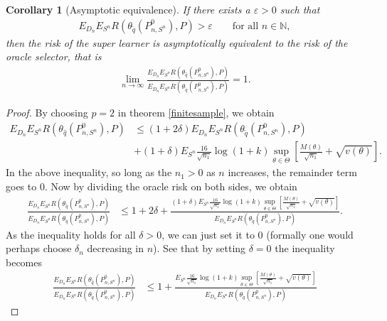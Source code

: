 \documentclass[11pt, a4paper]{article}
\newtheorem{corollary}[theorem]{Corollary}
\theoremstyle{definition}
\theoremstyle{remark}
\newcommand{\q}{q}
\newcommand{\btheta}{\theta}
\newcommand{\Sn}{S^n}
\begin{document}
\begin{corollary}[Asymptotic equivalence] 
    If there exists a $ \varepsilon > 0 $ such that 
   \begin{align*}
       E_{D_n} E_{\Sn} R(\btheta_{ \tilde{\q} }(P_{n, \Sn}^{0}), P) > \varepsilon \qquad \text{for all } n \in \mathbb{N},
   \end{align*}
    then the risk of the super learner is asymptotically equivalent to the risk of the oracle selector, that is
   \begin{align*}
       \lim_{n \to \infty} \frac{E_{D_n} E_{\Sn} R(\btheta_{ \hat{\q} }(P_{n, \Sn}^{0}), P)}{E_{D_n} E_{\Sn} R(\btheta_{ \tilde{\q} }(P_{n, \Sn}^{0}), P)} = 1.
   \end{align*}
\end{corollary}
\begin{proof}
    By choosing $ p = 2 $ in theorem \ref{finitesample}, we obtain
    \begin{align*}
        E_{D_n} E_{\Sn} R(\btheta_{\hat{\q}}(P_{n, \Sn}^{0}), P) &\leq(1 + 2 \delta) E_{D_n} E_{\Sn} R(\btheta_{ \tilde{\q}}(P_{n,\Sn}^{0}), P)\\
                                                                 &+(1 + \delta) E_{\Sn} \frac{16}{\sqrt{n_1}} \log (1 +k) \sup_{\btheta \in \Theta} \left[ \frac{M(\theta)}{\sqrt{n_1}} + \sqrt{v(\theta)} \right].
    \end{align*}
    In the above inequality, so long as the $ n_1 > 0 $ as $ n $ increases, the remainder term goes to $ 0 $. Now by dividing the oracle risk on both sides, we obtain
    \begin{align*}
        \frac{E_{D_n} E_{\Sn} R(\btheta_{\hat{\q}}(P_{n, \Sn}^{0}), P)}{E_{D_n} E_{\Sn} R(\btheta_{ \tilde{\q}}(P_{n,\Sn}^{0}), P)} &\leq 1 + 2 \delta + \frac{(1 + \delta)E_{\Sn} \frac{16}{\sqrt{n_1}} \log (1 +k) \sup_{\btheta \in \Theta} \left[ \frac{M(\theta)}{\sqrt{n_1}} + \sqrt{v(\theta)} \right]}{E_{D_n} E_{\Sn} R(\btheta_{ \tilde{\q}}(P_{n,\Sn}^{0}), P)} .
    \end{align*}
    As the inequality holds for all $ \delta > 0 $, we can just set it to 0 (formally one would perhaps choose $ \delta_n $ decreasing in $ n $). See that by setting $ \delta = 0 $ the inequality becomes 
    \begin{align*}
        \frac{E_{D_n} E_{\Sn} R(\btheta_{\hat{\q}}(P_{n, \Sn}^{0}), P)}{E_{D_n} E_{\Sn} R(\btheta_{ \tilde{\q}}(P_{n,\Sn}^{0}), P)} &\leq 1 + \frac{E_{\Sn} \frac{16}{\sqrt{n_1}} \log (1 +k) \sup_{\btheta \in \Theta} \left[ \frac{M(\theta)}{\sqrt{n_1}} + \sqrt{v(\theta)} \right]}{E_{D_n} E_{\Sn} R(\btheta_{ \tilde{\q}}(P_{n,\Sn}^{0}), P)} 

\end{align*}
\end{proof}
\end{document}
